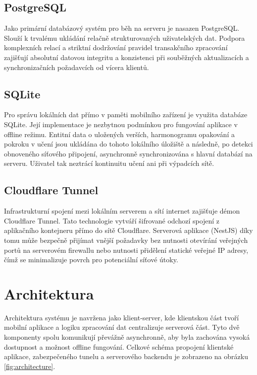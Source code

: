 \documentclass[12pt, a4paper, oneside]{article}
\begin{document}
	\subsection{PostgreSQL}
	Jako primární databázový systém pro běh na serveru je nasazen PostgreSQL. \cite{postgresql} Slouží k trvalému ukládání relačně strukturovaných  uživatelských dat. Podpora komplexních relací a striktní dodržování pravidel transakčního zpracování zajišťují absolutní datovou integritu a konzistenci při souběžných aktualizacích a synchronizačních požadavcích od vícera klientů.
	
	\subsection{SQLite}
	Pro správu lokálních dat přímo v paměti mobilního zařízení je využita databáze SQLite. \cite{sqlite} Její implementace je nezbytnou podmínkou pro fungování aplikace v offline režimu. Entitní data o uložených verších, harmonogramu opakování a pokroku v učení jsou ukládána do tohoto lokálního úložiště a následně, po detekci obnoveného síťového připojení, asynchronně synchronizována s hlavní databází na serveru. Uživatel tak neztrácí kontinuitu učení ani při výpadcích sítě.
	
	\subsection{Cloudflare Tunnel}
	Infrastrukturní spojení mezi lokálním serverem a sítí internet zajišťuje démon Cloudflare Tunnel. \cite{cloudflare} Tato technologie vytváří šifrované odchozí spojení z aplikačního kontejneru přímo do sítě Cloudflare. Serverová aplikace (NestJS) díky tomu může bezpečně přijímat vnější požadavky bez nutnosti otevírání veřejných portů na serverovém firewallu nebo nutnosti přidělení statické veřejné IP adresy, čímž se minimalizuje povrch pro potenciální síťové útoky.
	
	
	\newpage
	\section{Architektura}
	Architektura systému je navržena jako klient-server, kde klientskou část tvoří mobilní aplikace a logiku zpracování dat centralizuje serverová část. Tyto dvě komponenty spolu komunikují převážně asynchronně, aby byla zachována vysoká dostupnost a možnost offline fungování.
	Celkové schéma propojení klientské aplikace, zabezpečeného tunelu a serverového backendu je zobrazeno na obrázku \ref{fig:architecture}.
	
\end{document}
